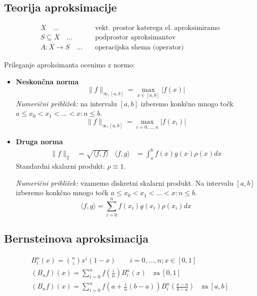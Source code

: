 
 

\begin{multicols}{5}
\setlength{\premulticols}{1pt}
\setlength{\postmulticols}{1pt}
\setlength{\multicolsep}{1pt}
\setlength{\columnsep}{2pt}

\section*{Teorija aproksimacije}
\begin{align*}
    X\quad \dots& \quad \text{vekt. prostor katerega el. aproksimiramo} \\
    S \subseteq X \quad \dots& \quad  \text{podprostor aproksimantov} \\
    A: X \to S \quad \dots& \quad \text{operacijska shema (operator)}
\end{align*}

Prileganje aproksimanta ocenimo z normo:
\begin{itemize}
    \item \textbf{Neskončna norma} 
    \[ \| f \|_{\infty, [a,b]} = \max_{x \in [a, b]} | f(x) | \]
    \textit{Numerični približek:} na intervalu $[a, b]$ izberemo konkčno mnogo točk $a \leq x_0 < x_1 < \dots < x:n \leq b$. 
    \[ \| f \|_{\infty, [a,b]} = \max_{i = 0, \dots, n} | f(x_i) | \]
    \item \textbf{Druga norma} 
    \begin{align*}
        \| f \|_{2} &= \sqrt{\langle f, f \rangle} &
        \langle f, g \rangle &= \int_a^b f(x) g(x) \rho(x) dx 
    \end{align*}
    Standardni skalarni produkt: $\rho \equiv 1$.

    \textit{Numerični približek:} vzamemo diskretni skalarni produkt.
    Na intervalu $[a, b]$ izberemo konkčno mnogo točk $a \leq x_0 < x_1 < \dots < x:n \leq b$.
    \[\langle f, g \rangle = \sum_{i=0}^n f(x_i) g(x_i) \rho(x_i) dx\]
\end{itemize}

\subsection*{Bernsteinova aproksimacija}
\begin{gather*}
    B_i^n(x) = \binom{n}{i} x^i (1-x) \qquad i = 0, \dots, n; x \in [0, 1] \\
    (B_n f)(x) = \sum_{i=0}^n f(\frac{i}{n}) B_i^n(x) \quad \text{za}\ [0, 1] \\
    (B_n f)(x) = \sum_{i=0}^n f\left(a+\frac{i}{n}(b-a)\right) B_i^n\left(\frac{x-a}{b-a}\right) \quad \text{za}\ [a, b] \\
\end{gather*}



\end{multicols}
